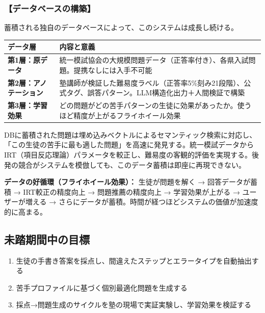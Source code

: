 \documentclass[paper=a4,fontsize=10.5bp,jafontsize=10.5bp,twocolumn]{jlreq}
\begin{document}
\subsubsection{【データベースの構築】}

蓄積される独自のデータベースによって、このシステムは成長し続ける。


\begin{footnotesize}\noindent
\begin{tabularx}{\linewidth}{>{\bfseries}l X}
\toprule
データ層 & 内容と意義 \\
\midrule
第1層：原データ & 統一模試協会の大規模問題データ（正答率付き）、各県入試問題。提携なしには入手不可能 \\
第2層：アノテーション & 塾講師が検証した難易度ラベル（正答率5\%刻み21段階）、公式タグ、誤答パターン。LLM構造化出力＋人間検証で構築 \\
第3層：学習効果 & どの問題がどの苦手パターンの生徒に効果があったか。使うほど精度が上がるフライホイール効果 \\
\bottomrule
\end{tabularx}
\end{footnotesize}


DBに蓄積された問題は埋め込みベクトルによるセマンティック検索に対応し、「この生徒の苦手に最も適した問題」を高速に発見する。統一模試データからIRT（項目反応理論）パラメータを較正し、難易度の客観的評価を実現する。後発の競合がシステムを模倣しても、このデータ蓄積は即座に再現できない。


\begin{graybox}
\textbf{データの好循環（フライホイール効果）：}
生徒が問題を解く → 回答データが蓄積 → IRT較正の精度向上 → 問題推薦の精度向上 → 学習効果が上がる → ユーザーが増える → さらにデータが蓄積。時間が経つほどシステムの価値が加速度的に高まる。
\end{graybox}

\subsection{未踏期間中の目標}

\begin{enumerate}[leftmargin=2em]
  \item 生徒の手書き答案を採点し、間違えたステップとエラータイプを自動抽出する
  \item 苦手プロファイルに基づく個別最適化問題を生成する
  \item 採点→問題生成のサイクルを塾の現場で実証実験し、学習効果を検証する
\end{enumerate}
\end{document}

